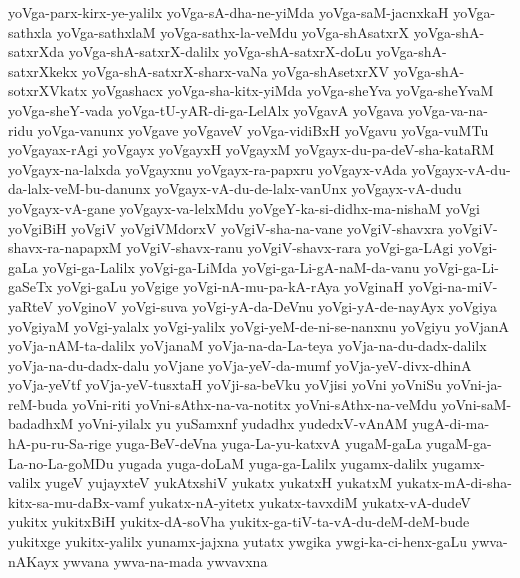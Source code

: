 {yoVga-parx-kirx-ye-yalilx
yoVga-sA-dha-ne-yiMda
yoVga-saM-jacnxkaH
yoVga-sathxla
yoVga-sathxlaM
yoVga-sathx-la-veMdu
yoVga-shAsatxrX
yoVga-shA-satxrXda
yoVga-shA-satxrX-dalilx
yoVga-shA-satxrX-doLu
yoVga-shA-satxrXkekx
yoVga-shA-satxrX-sharx-vaNa
yoVga-shAsetxrXV
yoVga-shA-sotxrXVkatx
yoVgashacx
yoVga-sha-kitx-yiMda
yoVga-sheYva
yoVga-sheYvaM
yoVga-sheY-vada
yoVga-tU-yAR-di-ga-LelAlx
yoVgavA
yoVgava
yoVga-va-na-ridu
yoVga-vanunx
yoVgave
yoVgaveV
yoVga-vidiBxH
yoVgavu
yoVga-vuMTu
yoVgayax-rAgi
yoVgayx
yoVgayxH
yoVgayxM
yoVgayx-du-pa-deV-sha-kataRM
yoVgayx-na-lalxda
yoVgayxnu
yoVgayx-ra-papxru
yoVgayx-vAda
yoVgayx-vA-du-da-lalx-veM-bu-danunx
yoVgayx-vA-du-de-lalx-vanUnx
yoVgayx-vA-dudu
yoVgayx-vA-gane
yoVgayx-va-lelxMdu
yoVgeY-ka-si-didhx-ma-nishaM
yoVgi
yoVgiBiH
yoVgiV
yoVgiVMdorxV
yoVgiV-sha-na-vane
yoVgiV-shavxra
yoVgiV-shavx-ra-napapxM
yoVgiV-shavx-ranu
yoVgiV-shavx-rara
yoVgi-ga-LAgi
yoVgi-gaLa
yoVgi-ga-Lalilx
yoVgi-ga-LiMda
yoVgi-ga-Li-gA-naM-da-vanu
yoVgi-ga-Li-gaSeTx
yoVgi-gaLu
yoVgige
yoVgi-nA-mu-pa-kA-rAya
yoVginaH
yoVgi-na-miV-yaRteV
yoVginoV
yoVgi-suva
yoVgi-yA-da-DeVnu
yoVgi-yA-de-nayAyx
yoVgiya
yoVgiyaM
yoVgi-yalalx
yoVgi-yalilx
yoVgi-yeM-de-ni-se-nanxnu
yoVgiyu
yoVjanA
yoVja-nAM-ta-dalilx
yoVjanaM
yoVja-na-da-La-teya
yoVja-na-du-dadx-dalilx
yoVja-na-du-dadx-dalu
yoVjane
yoVja-yeV-da-mumf
yoVja-yeV-divx-dhinA
yoVja-yeVtf
yoVja-yeV-tusxtaH
yoVji-sa-beVku
yoVjisi
yoVni
yoVniSu
yoVni-ja-reM-buda
yoVni-riti
yoVni-sAthx-na-va-notitx
yoVni-sAthx-na-veMdu
yoVni-saM-badadhxM
yoVni-yilalx
yu
yuSamxnf
yudadhx
yudedxV-vAnAM
yugA-di-ma-hA-pu-ru-Sa-rige
yuga-BeV-deVna
yuga-La-yu-katxvA
yugaM-gaLa
yugaM-ga-La-no-La-goMDu
yugada
yuga-doLaM
yuga-ga-Lalilx
yugamx-dalilx
yugamx-valilx
yugeV
yujayxteV
yukAtxshiV
yukatx
yukatxH
yukatxM
yukatx-mA-di-sha-kitx-sa-mu-daBx-vamf
yukatx-nA-yitetx
yukatx-tavxdiM
yukatx-vA-dudeV
yukitx
yukitxBiH
yukitx-dA-soVha
yukitx-ga-tiV-ta-vA-du-deM-deM-bude
yukitxge
yukitx-yalilx
yunamx-jajxna
yutatx
ywgika
ywgi-ka-ci-henx-gaLu
ywva-nAKayx
ywvana
ywva-na-mada
ywvavxna
}
